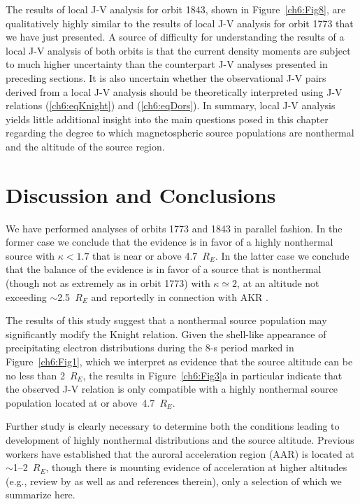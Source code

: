   The results of local J-V analysis for orbit 1843, shown in
  Figure~\ref{ch6:Fig8}, are qualitatively highly similar to the results of
  local J-V analysis for orbit 1773 that we have just presented. A source of
  difficulty for understanding the results of a local J-V analysis of both
  orbits is that the current density moments are subject to much higher
  uncertainty than the counterpart J-V analyses presented in preceding
  sections. It is also uncertain whether the observational J-V pairs derived
  from a local J-V analysis should be theoretically interpreted using J-V
  relations (\ref{ch6:eqKnight}) and (\ref{ch6:eqDors}). In summary, local J-V
  analysis yields little additional insight into the main questions posed in
  this chapter regarding the degree to which magnetospheric source populations
  are nonthermal and the altitude of the source region.

  \section{Discussion and Conclusions}

  We have performed analyses of orbits 1773 and 1843 in parallel fashion. In the
  former case we conclude that the evidence is in favor of a highly nonthermal
  source with $\kappa < 1.7$ that is near or above 4.7~$R_E$. In the latter case
  we conclude that the balance of the evidence is in favor of a source that is
  nonthermal (though not as extremely as in orbit 1773) with $\kappa \simeq 2$,
  at an altitude not exceeding $\sim$2.5~$R_E$ and reportedly in connection with
  AKR \citep{Ergun1998}.

  The results of this study suggest that a nonthermal source population may
  significantly modify the Knight relation. Given the shell-like appearance of
  precipitating electron distributions during the 8-s period marked in
  Figure~\ref{ch6:Fig1}, which we interpret as evidence that the source altitude
  can be no less than 2~$R_E$, the results in Figure~\ref{ch6:Fig3}a in
  particular indicate that the observed J-V relation is only compatible with a
  highly nonthermal source population located at or above~4.7~$R_E$. 

  Further study is clearly necessary to determine both the conditions leading to
  development of highly nonthermal distributions and the source
  altitude. Previous workers have established that the auroral acceleration
  region (AAR) is located at $\sim$1--2~$R_E$, though there is mounting evidence
  of acceleration at higher altitudes (e.g., review by \citet{Mottez2016} as
  well as \citet{Watt2012} and references therein), only a selection of which we
  summarize here.

